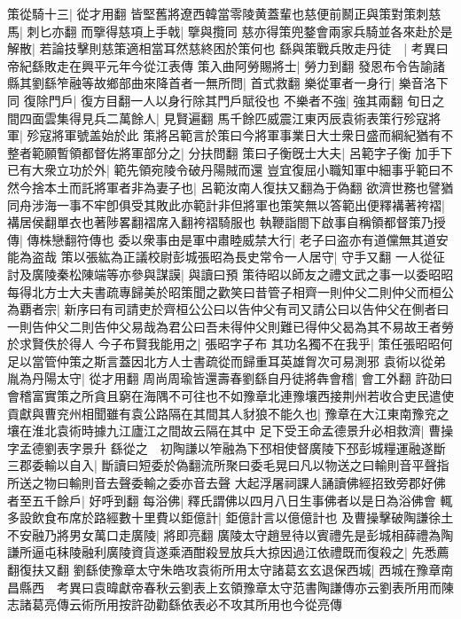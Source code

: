 策從騎十三|{
	從才用翻}
皆堅舊將遼西韓當零陵黄蓋輩也慈便前鬭正與策對策刺慈馬|{
	刺匕亦翻}
而擥得慈項上手戟|{
	擥與攬同}
慈亦得策兜鍪會兩家兵騎並各來赴於是解散|{
	若論技擊則慈策適相當耳然慈終困於策何也}
繇與策戰兵敗走丹徒　|{
	考異曰帝紀繇敗走在興平元年今從江表傳}
策入曲阿勞賜將士|{
	勞力到翻}
發恩布令告諭諸縣其劉繇笮融等故鄉部曲來降首者一無所問|{
	首式救翻}
樂從軍者一身行|{
	樂音洛下同}
復除門戶|{
	復方目翻一人以身行除其門戶賦役也}
不樂者不強|{
	強其兩翻}
旬日之間四面雲集得見兵二萬餘人|{
	見賢遍翻}
馬千餘匹威震江東丙辰袁術表策行殄寇將軍|{
	殄寇將軍號盖始於此}
策將呂範言於策曰今將軍事業日大士衆日盛而綱紀猶有不整者範願暫領都督佐將軍部分之|{
	分扶問翻}
策曰子衡旣士大夫|{
	呂範字子衡}
加手下已有大衆立功於外|{
	範先領宛陵令破丹陽賊而還}
豈宜復屈小職知軍中細事乎範曰不然今捨本土而託將軍者非為妻子也|{
	呂範汝南人復扶又翻為于偽翻}
欲濟世務也譬猶同舟涉海一事不牢卽俱受其敗此亦範計非但將軍也策笑無以答範出便釋褠著袴褶|{
	褠居侯翻單衣也著陟畧翻褶席入翻袴褶騎服也}
執鞭詣閤下啟事自稱領都督策乃授傳|{
	傳株戀翻符傳也}
委以衆事由是軍中肅睦威禁大行|{
	老子曰盗亦有道儻無其道安能為盗哉}
策以張紘為正議校尉彭城張昭為長史常令一人居守|{
	守手又翻}
一人從征討及廣陵秦松陳端等亦參與謀謨|{
	與讀曰預}
策待昭以師友之禮文武之事一以委昭昭每得北方士大夫書疏專歸美於昭策聞之歡笑曰昔管子相齊一則仲父二則仲父而桓公為覇者宗|{
	新序曰有司請吏於齊桓公公曰以告仲父有司又請公曰以告仲父在側者曰一則告仲父二則告仲父易哉為君公曰吾未得仲父則難已得仲父曷為其不易故王者勞於求賢佚於得人}
今子布賢我能用之|{
	張昭字子布}
其功名獨不在我乎|{
	策任張昭昭何足以當管仲策之斯言蓋因北方人士書疏從而歸重耳英雄胷次可易測邪}
袁術以從弟胤為丹陽太守|{
	從才用翻}
周尚周瑜皆還壽春劉繇自丹徒將犇會稽|{
	會工外翻}
許劭曰會稽富實策之所貪且窮在海隅不可往也不如豫章北連豫壤西接荆州若收合吏民遣使貢獻與曹兖州相聞雖有袁公路隔在其間其人豺狼不能久也|{
	豫章在大江東南豫兖之壤在淮北袁術時據九江廬江之間故云隔在其中}
足下受王命孟德景升必相救濟|{
	曹操字孟德劉表字景升}
繇從之　初陶謙以笮融為下邳相使督廣陵下邳彭城糧運融遂斷三郡委輸以自入|{
	斷讀曰短委於偽翻流所聚曰委毛晃曰凡以物送之曰輸則音平聲指所送之物曰輸則音去聲委輸之委亦音去聲}
大起浮屠祠課人誦讀佛經招致旁郡好佛者至五千餘戶|{
	好呼到翻}
每浴佛|{
	釋氏謂佛以四月八日生事佛者以是日為浴佛會}
輒多設飲食布席於路經數十里費以鉅億計|{
	鉅億計言以億億計也}
及曹操擊破陶謙徐土不安融乃將男女萬口走廣陵|{
	將即亮翻}
廣陵太守趙昱待以賓禮先是彭城相薛禮為陶謙所逼屯秣陵融利廣陵資貨遂乘酒酣殺昱放兵大掠因過江依禮既而復殺之|{
	先悉薦翻復扶又翻}
劉繇使豫章太守朱皓攻袁術所用太守諸葛玄玄退保西城|{
	西城在豫章南昌縣西　考異曰袁暐獻帝春秋云劉表上玄領豫章太守范書陶謙傳亦云劉表所用而陳志諸葛亮傳云術所用按許劭勸繇依表必不攻其所用也今從亮傳}
